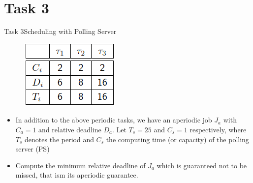
\section{Task 3}

\setcounter{task}{1}

\begin{frame}{Task 3}{Scheduling with Polling Server}
  \begin{tasknoinc}
    \begin{figure}
       \centering
       \includegraphics[scale=0.8]{figures/periodic_tasks_3.1.PNG}
       \label{fig:my_label}
   \end{figure}
   \begin{itemize}
       \item In addition to the above periodic tasks, we have an aperiodic job $J_a$ with $C_a = 1$ and relative deadline $D_a$. Let $T_s = 25$ and $C_s = 1$ respectively, where $T_s$ denotes the period and $C_s$ the computing time (or capacity) of the polling server (PS)
       \item Compute the minimum relative deadline of $J_a$ which is guaranteed not to be missed, that ism its aperiodic guarantee.
   \end{itemize}
  \end{tasknoinc}
\end{frame}

